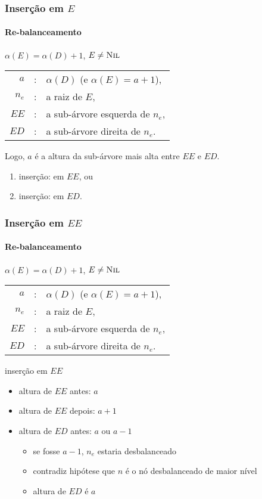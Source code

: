 \documentclass{beamer}
\begin{document}
\begin{frame}

\frametitle{Inserção em $E$}
\framesubtitle{Re-balanceamento}

$\alpha(E) = \alpha(D)+1$, $E \neq \textnormal{\scshape Nil}$

\begin{tabular}{rcl}
$a$ & : & $\alpha(D)$ (e $\alpha(E) = a+1$), \\
$n_e$ & : & a raiz de $E$, \\
$EE$ & : & a sub-árvore esquerda de $n_e$, \\ 
$ED$ & : & a sub-árvore direita de $n_e$.
\end{tabular}

Logo, $a$ é a altura da sub-árvore mais alta entre $EE$ e $ED$.

\begin{enumerate}

\item inserção: em $EE$, ou

\item inserção: em $ED$.

\end{enumerate}

\end{frame}

\begin{frame}

\frametitle{Inserção em $EE$}
\framesubtitle{Re-balanceamento}

$\alpha(E) = \alpha(D)+1$, $E \neq \textnormal{\scshape Nil}$

\begin{tabular}{rcl}
$a$ & : & $\alpha(D)$ (e $\alpha(E) = a+1$), \\
$n_e$ & : & a raiz de $E$, \\
$EE$ & : & a sub-árvore esquerda de $n_e$, \\ 
$ED$ & : & a sub-árvore direita de $n_e$.
\end{tabular}

inserção em $EE$

\begin{itemize}

\item altura de $EE$ antes: $a$

\item altura de $EE$ depois: $a+1$

\item altura de $ED$ antes: $a$ ou $a-1$

\begin{itemize}

\item se fosse $a-1$, $n_e$ estaria desbalanceado

\item contradiz hipótese que $n$ é o nó desbalanceado de maior nível

\item altura de $ED$ é $a$

\end{itemize}

\end{itemize}

\end{frame}
\end{document}
